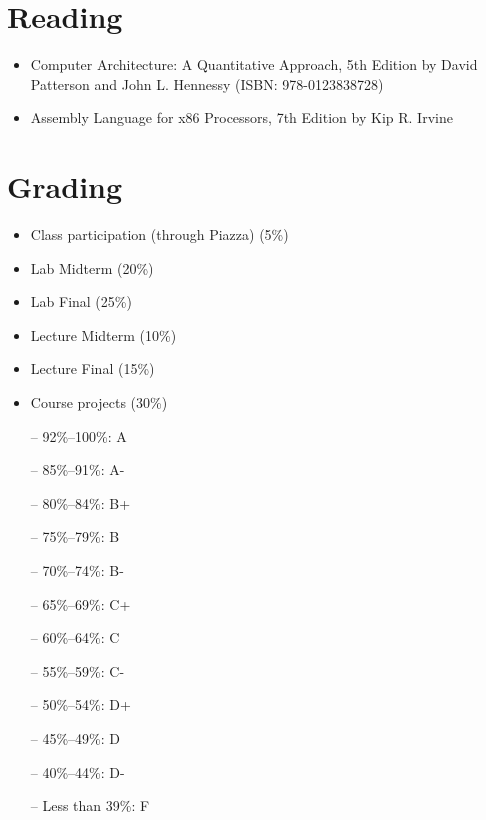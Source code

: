 \documentclass[12pt,a4paper,oneside]{article}
\begin{document}
    \section{Reading}

        \begin{itemize}
            \item Computer Architecture: A Quantitative Approach, 5th Edition by David Patterson and John L. Hennessy (ISBN: 978-0123838728)
            \item Assembly Language for x86 Processors, 7th Edition by Kip R. Irvine
        \end{itemize}

    \section{Grading}

        \begin{itemize}
            \item Class participation (through Piazza) (5\%)
            \item Lab Midterm (20\%)
            \item Lab Final (25\%)
            \item Lecture Midterm (10\%)
            \item Lecture Final (15\%)
            \item Course projects (30\%)
        \end{itemize}

        \begin{itemize} \itemsep-10pt \parskip0pt 
            \item[--] 92\%--100\%: A\\
            \item[--] 85\%--91\%: A-\\
            \item[--] 80\%--84\%: B+\\
            \item[--] 75\%--79\%: B\\
            \item[--] 70\%--74\%: B-\\
            \item[--] 65\%--69\%: C+\\
            \item[--] 60\%--64\%: C\\
            \item[--] 55\%--59\%: C-\\
            \item[--] 50\%--54\%: D+\\
            \item[--] 45\%--49\%: D\\
            \item[--] 40\%--44\%: D-\\
            \item[--] Less than 39\%: F
        \end{itemize}
\end{document}
